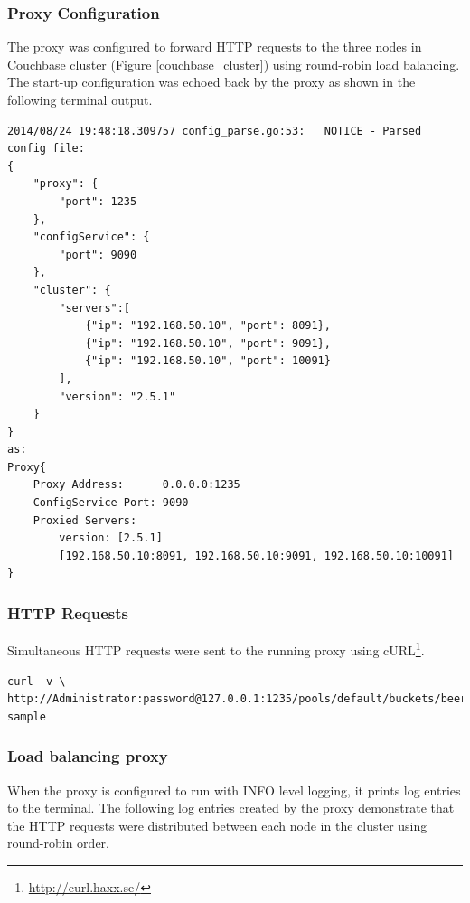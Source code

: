 \documentclass[a4paper,11pt,twoside]{report}
\begin{document}
\subsubsection*{Proxy Configuration} 
The proxy was configured to forward HTTP requests to the three nodes in Couchbase cluster (Figure \ref{couchbase_cluster}) using round-robin load balancing. The start-up configuration was echoed back by the proxy as shown in the following terminal output.\bigskip
\begin{lstlisting}[language=terminal]
2014/08/24 19:48:18.309757 config_parse.go:53:   NOTICE - Parsed config file:
{
    "proxy": {
        "port": 1235
    },
    "configService": {
        "port": 9090
    },
    "cluster": {
        "servers":[
            {"ip": "192.168.50.10", "port": 8091},
            {"ip": "192.168.50.10", "port": 9091},
            {"ip": "192.168.50.10", "port": 10091}
        ],
        "version": "2.5.1"
    }
}
as:
Proxy{
	Proxy Address:      0.0.0.0:1235
	ConfigService Port: 9090
	Proxied Servers:    
		version: [2.5.1] 
		[192.168.50.10:8091, 192.168.50.10:9091, 192.168.50.10:10091]
}
\end{lstlisting}

\subsubsection*{HTTP Requests} 
Simultaneous HTTP requests were sent to the running proxy using cURL\footnote{\label{curl_link} \url{http://curl.haxx.se/}}. \smallskip
\begin{lstlisting}[language=terminal]
curl -v \ 
http://Administrator:password@127.0.0.1:1235/pools/default/buckets/beer-sample
\end{lstlisting}


\subsubsection*{Load balancing proxy} 
When the proxy is configured to run with INFO level logging, it prints log entries to the terminal. The following log entries created by the proxy demonstrate that the HTTP requests were distributed between each node in the cluster using round-robin order.\smallskip

\end{document}
